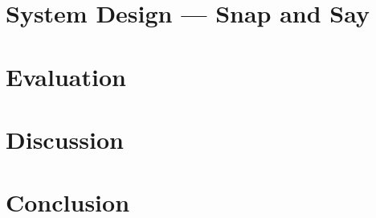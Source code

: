 \documentclass[12pt, a4paper, openany]{report}
\begin{document}
\chapter{System Design --- Snap and Say}
\label{ch:system}


\chapter{Evaluation}
\label{ch:evaluation}


\chapter{Discussion}
\label{ch:discussion}


\chapter{Conclusion}
\label{ch:conclusion}




\appendix


\end{document}
